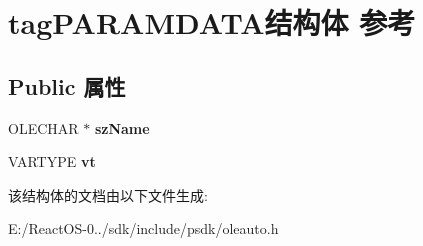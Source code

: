 \hypertarget{structtag_p_a_r_a_m_d_a_t_a}{}\section{tag\+P\+A\+R\+A\+M\+D\+A\+T\+A结构体 参考}
\label{structtag_p_a_r_a_m_d_a_t_a}
\subsection*{Public 属性}
\begin{DoxyCompactItemize}
\item 
\mbox{\label{structtag_p_a_r_a_m_d_a_t_a_a82bf78f79ab2851ba8781a45bac0be6a}} 
O\+L\+E\+C\+H\+AR $\ast$ {\bfseries sz\+Name}
\item 
\mbox{\label{structtag_p_a_r_a_m_d_a_t_a_ae2840bb9f1eceb4f65390636c2119d4e}} 
V\+A\+R\+T\+Y\+PE {\bfseries vt}
\end{DoxyCompactItemize}


该结构体的文档由以下文件生成\+:\begin{DoxyCompactItemize}
\item 
E\+:/\+React\+O\+S-\/0../sdk/include/psdk/oleauto.\+h\end{DoxyCompactItemize}
